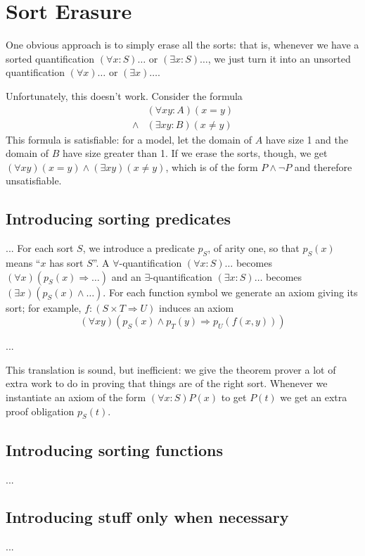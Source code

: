 
\section{Sort Erasure}

One obvious approach is to simply erase all the sorts: that is,
whenever we have a sorted quantification $(\forall x:S)\ldots$ or
$(\exists x:S)\ldots$, we just turn it into an unsorted quantification
$(\forall x)\ldots$ or $(\exists x)\ldots$.

Unfortunately, this doesn't work. Consider the formula
\begin{align*}
& (\forall x y:A)(x = y) \\
\land & (\exists x y:B)(x \neq y)
\end{align*}
This formula is satisfiable: for a model, let the domain of $A$ have
size 1 and the domain of $B$ have size greater than 1. If we erase the
sorts, though, we get $(\forall x y)(x = y) \land (\exists x y)(x \neq
y)$, which is of the form $P \land \neg P$ and therefore
unsatisfiable.

\subsection{Introducing sorting predicates}

... For each sort $S$, we introduce a predicate $p_S$, of arity one,
so that $p_S(x)$ means ``$x$ has sort $S$''. A
$\forall$-quantification $(\forall x:S)\ldots$ becomes $(\forall
x)(p_S(x) \Rightarrow \ldots)$ and an $\exists$-quantification
$(\exists x:S)\ldots$ becomes $(\exists x)(p_S(x) \land \ldots)$. For
each function symbol we generate an axiom giving its sort; for
example, $f : (S \times T \Rightarrow U)$ induces an axiom
\begin{displaymath}
(\forall x y)(p_S(x) \land p_T(y) \Rightarrow p_U(f(x, y)))
\end{displaymath}

...

This translation is sound, but inefficient: we give the theorem prover
a lot of extra work to do in proving that things are of the right
sort. Whenever we instantiate an axiom of the form $(\forall
x:S)P(x)$ to get $P(t)$ we get an extra proof obligation $p_S(t)$.

\subsection{Introducing sorting functions}

...

\subsection{Introducing stuff only when necessary}

...
